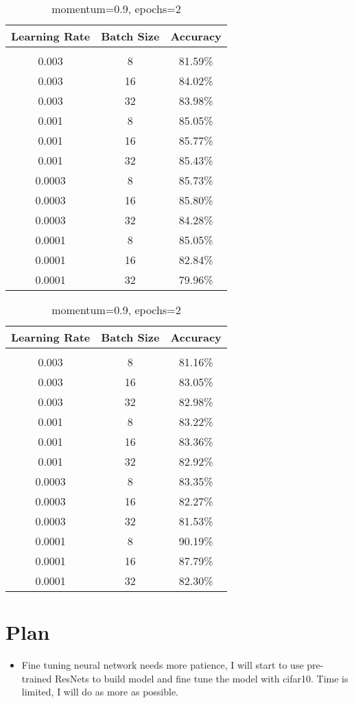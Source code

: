 \documentclass{article} %
\begin{document}
\begin{itemize}
\begin{table}[h]
\caption{momentum=0.9, epochs=2}
\begin{center}
\begin{tabular}{c|c|c}
\multicolumn{1}{c}{\bf Learning Rate}&\multicolumn{1}{c}{\bf Batch Size} &\multicolumn{1}{c}{\bf Accuracy}
\\ \hline \\
0.003 & 8 & 81.59\% \\
0.003 & 16 & 84.02\% \\
0.003 & 32 & 83.98\% \\
0.001 & 8 & 85.05\% \\
0.001 & 16 & 85.77\% \\
0.001 & 32 & 85.43\% \\
0.0003 & 8 & 85.73\% \\
0.0003 & 16 & 85.80\% \\
0.0003 & 32 & 84.28\% \\
0.0001 & 8 & 85.05\% \\
0.0001 & 16 & 82.84\% \\
0.0001 & 32 & 79.96\% \\
\end{tabular}
\end{center}
\end{table}


\begin{table}[h]
\caption{momentum=0.9, epochs=2}
\begin{center}
\begin{tabular}{c|c|c}
\multicolumn{1}{c}{\bf Learning Rate}&\multicolumn{1}{c}{\bf Batch Size} &\multicolumn{1}{c}{\bf Accuracy}
\\ \hline \\
0.003 & 8 & 81.16\% \\
0.003 & 16 & 83.05\% \\
0.003 & 32 & 82.98\% \\
0.001 & 8 & 83.22\% \\
0.001 & 16 & 83.36\% \\
0.001 & 32 & 82.92\% \\
0.0003 & 8 & 83.35\% \\
0.0003 & 16 & 82.27\% \\
0.0003 & 32 & 81.53\% \\
0.0001 & 8 & 90.19\% \\
0.0001 & 16 & 87.79\% \\
0.0001 & 32 & 82.30\% \\
\end{tabular}
\end{center}
\end{table}

\end{itemize}

\section{Plan}
\begin{itemize}
\item Fine tuning neural network needs more patience, I will start to use pre-trained ResNets to build model and fine tune the model with cifar10. Time is limited, I will do as more as possible.
\end{itemize}
\end{document}

